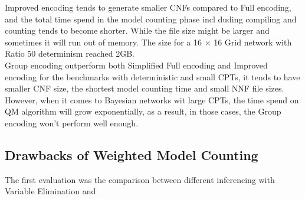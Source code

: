 Improved encoding tends to generate smaller CNFs compared to Full encoding, and the total time spend in the model counting phase incl duding compiling and counting tends to become shorter. While the file size might be larger and sometimes it will run out of memory. The size for a 16 $\times$ 16 Grid network with Ratio 50 determinism reached 2GB.\\

Group encoding outperform both Simplified Full encoding and Improved encoding for the benchmarks with deterministic and small CPTs, it tends to have smaller CNF size, the shortest model counting time and small NNF file sizes. However, when it comes to Bayesian networks wit large CPTs, the time spend on QM algorithm will grow exponentially, as a result, in those cases, the Group encoding won't perform well enough.

\subsection{Drawbacks of Weighted Model Counting}
The first evaluation was the comparison between different inferencing with Variable Elimination and 

